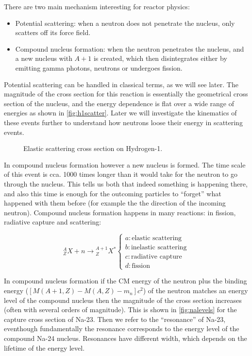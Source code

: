 There are two main mechanism interesting for reactor physics:

\begin{itemize}
\item Potential scattering: when a neutron does not penetrate the nucleus, only scatters off its force field.
\item Compound nucleus formation: when the neutron penetrates the nucleus, and a new nucleus with $A+1$ is created, which then disintegrates either by emitting gamma photons, neutrons or undergoes fission.
\end{itemize}

Potential scattering can be handled in classical terms, as we will see later. The magnitude of the cross section for this reaction is essentially the geometrical cross section of the nucleus, and the energy dependence is flat over a wide range of energies as shown in \autoref{fig:h1scatter}. Later we will investigate the kinematics of these events further to understand how neutrons loose their energy in scattering events.

\begin{figure}[ht!]
\protect {}\protect
\caption{\label{fig:h1scatter} \footnotesize{Elastic scattering cross section on Hydrogen-1.}}
\end{figure}

In compound nucleus formation however a new nucleus is formed. The time scale of this event is cca. 1000 times longer than it would take for the neutron to go through the nucleus. This tells us both that indeed something is happening there, and also this time is enough for the outcoming particles to ``forget'' what happened with them before (for example the the direction of the incoming neutron). Compound nucleus formation happens in many reactions: in fission, radiative capture and scattering:

\begin{equation}
    {}_Z^AX + n \rightarrow {}_Z^{A+1}X^*
    \begin{cases}
      a: \text{elastic scattering} \\
      b: \text{inelastic scattering} \\
      c: \text{radiative capture} \\
      d: \text{fission}
    \end{cases}
\end{equation}
    
In compound nucleus formation if the CM energy of the neutron plus the binding energy ($[M(A+1,Z)-M(A,Z)-m_n]c^2$) of the neutron matches an energy level of the compound nucleus then the magnitude of the cross section increases (often with several orders of magnitude). This is shown in \autoref{fig:nalevels} for the capture cross section of Na-23. Then we refer to the ``resonance'' of Na-23, eventhough fundamentally the resonance corresponds to the energy level of the compound Na-24 nucleus. Resonances have different width, which depends on the lifetime of the energy level.

